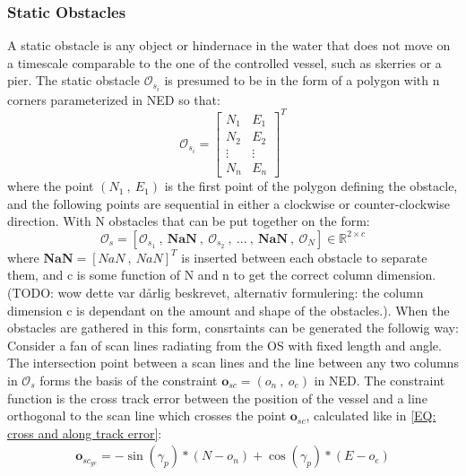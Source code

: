 \subsubsection*{Static Obstacles} \label{CHAP: static_obs}
A static obstacle is any object or hindernace in the water that does not move on a timescale comparable to the one of the controlled
vessel, such as skerries or a pier. The static obstacle $\mathcal{O}_{s_{i}}$ is presumed to be in the form of a polygon with n corners parameterized
in NED so that:
\begin{equation}
    \mathcal{O}_{s_{i}} = \begin{bmatrix}
                              N_1 & E_1 \\
                              N_2 & E_2 \\
                            \vdots & \vdots\\
                              N_n & E_n
                            \end{bmatrix}^T
\end{equation}
where the point $(N_1 \ , \ E_1)$ is the first point of the polygon defining the obstacle, and the following points are sequential in either a clockwise
or counter-clockwise direction. With N obstacles that can be put together on the form:
\begin{equation}
    \mathcal{O}_s = [\mathcal{O}_{s_{1}} \ , \ \textbf{NaN} \ , \ \mathcal{O}_{s_{2}} \ , \ ... \ , \ \textbf{NaN} \ , \ \mathcal{O}_N] \in \mathbb{R}^{2 \times c}
\end{equation}
where $\textbf{NaN} = [NaN \ , \ NaN]^T$ is inserted between each obstacle to separate them, and c is some function of N and n to get the correct column dimension.
(TODO: wow dette var dårlig beskrevet, alternativ formulering: the column dimension c is dependant on the amount and shape of the obstacles.). 
When the obstacles are gathered in this form, consrtaints can be generated the followig way:\newline
Consider a fan of scan lines radiating from the \gls{OS} with fixed length and angle. The intersection
point between a scan lines and the line between any two columns in $\mathcal{O}_s$ forms the basis of the constraint 
$\mathbf{o}_{sc} = (o_n \ , \ o_e)$ in NED.\newline
The constraint function is the cross track error between the position of the vessel and a line orthogonal to the scan line which crosses
the point $\mathbf{o}_{sc}$, calculated like in \eqref{EQ: cross and along track error}:
\begin{eqnarray} \label{EQ: Static ye}
    \mathbf{o}_{sc_{ye}} = -\sin(\gamma_p)*(N-o_n) + \cos(\gamma_p)*(E-o_e)
\end{eqnarray}
